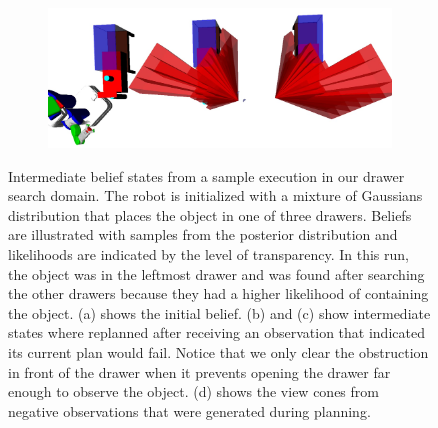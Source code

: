 \begin{figure}
\begin{subfigure}[b]{0.48\linewidth}
    \caption{}
  \end{subfigure}
  \begin{subfigure}[b]{0.48\linewidth}
    \includegraphics[width=\textwidth]{drawer_images/drawer_dist_negreg.png}
    \caption{}
  \end{subfigure}
  \caption{Intermediate belief states from a sample execution in our
    drawer search domain. The robot is initialized with a mixture of
    Gaussians distribution that places the object in one of three
    drawers. Beliefs are illustrated with samples from the posterior
    distribution and likelihoods are indicated by the level of
    transparency. In this run, the object was in the leftmost drawer
    and was found after searching the other drawers because they had a
    higher likelihood of containing the object. (a) shows the initial
    belief. (b) and (c) show intermediate states where \ibsp{}
    replanned after receiving an observation that indicated its
    current plan would fail. Notice that we only clear the obstruction
    in front of the drawer when it prevents opening the drawer far
    enough to observe the object. (d) shows the view cones from
    negative observations that were generated during planning.}
  \label{fig:drawerimgs}
\end{figure}

